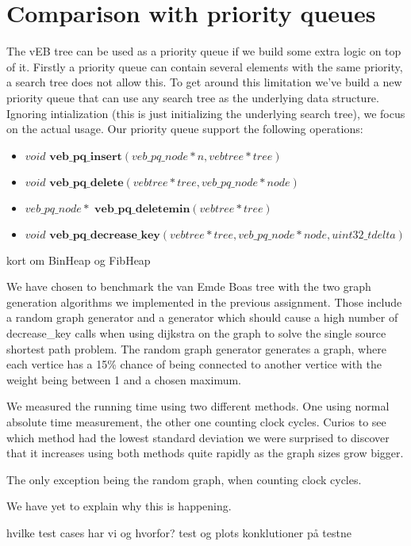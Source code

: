 \section*{Comparison with priority queues}
The vEB tree can be used as a priority queue if we build some extra logic on top of it. Firstly a priority queue can contain several elements with the same priority, a search tree does not allow this. To get around this limitation we've build a new priority queue that can use any search tree as the underlying data structure. Ignoring intialization (this is just initializing the underlying search tree), we focus on the actual usage. Our priority queue support the following operations:

\begin{itemize}
  \item $void \textbf{ veb\_pq\_insert}(veb\_pq\_node * n, vebtree * tree)$
  \item $void \textbf{ veb\_pq\_delete}(vebtree * tree, veb\_pq\_node * node)$
  \item $veb\_pq\_node * \textbf{ veb\_pq\_deletemin}(vebtree * tree)$
  \item $void \textbf{ veb\_pq\_decrease\_key}(vebtree * tree, veb\_pq\_node * node, uint32\_t delta)$
\end{itemize}



kort om BinHeap og FibHeap

We have chosen to benchmark the van Emde Boas tree with the two graph generation algorithms we implemented in the previous assignment.
Those include a random graph generator and a generator which should cause a high number of decrease\_key calls when using dijkstra on the graph to solve the single source shortest path problem.
The random graph generator generates a graph, where each vertice has a 15\% chance of being connected to another vertice with the weight being between 1 and a chosen maximum.







We measured the running time using two different methods. One using normal absolute time measurement, the other one counting clock cycles. Curios to see which method had the lowest standard deviation we were surprised to discover that it increases using both methods quite rapidly as the graph sizes grow bigger.



The only exception being the random graph, when counting clock cycles.



We have yet to explain why this is happening.

hvilke test cases har vi og hvorfor?
test og plots
konklutioner på testne